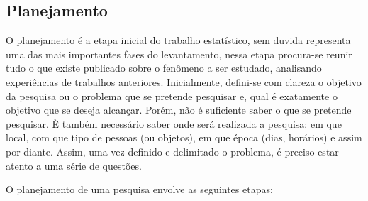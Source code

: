 \subsection{Planejamento}

O planejamento é a etapa inicial do trabalho estatístico, sem duvida representa uma das mais importantes fases do levantamento, nessa etapa procura-se reunir tudo o que existe publicado sobre o fe\-nô\-me\-no a ser estudado, analisando experiências de trabalhos anteriores. Inicialmente, defini-se com clareza o objetivo da pesquisa ou o problema que se pretende pesquisar e, qual é exatamente o objetivo que se deseja alcançar. Porém, não é suficiente saber o que se pretende pesquisar. È também necessário saber onde será realizada a pesquisa: em que local, com que tipo de pessoas (ou objetos), em que época (dias, horários) e assim por diante. Assim, uma vez definido e delimitado o problema, é preciso estar atento a uma série de questões.\vskip0.3cm


O planejamento de uma pesquisa envolve as seguintes etapas:


